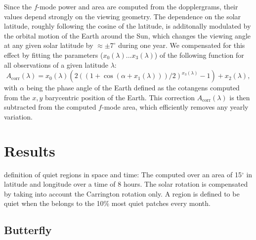 \documentclass{aa}
\begin{document}
Since the $f$-mode power and area are computed from the \los{} dopplergrams, their values depend strongly on the viewing geometry. The dependence on the solar latitude, roughly following the cosine of the latitude, is additonally modulated by the orbital motion of the Earth around the Sun, which changes the viewing angle at any given solar latitude by $\approx \pm7^\circ$ during one year. We compensated for this effect by fitting the parameters ($x_0(\lambda)...x_3(\lambda)$) of the following function for all observations of a given latitude $\lambda$:
\begin{equation}
\label{eq:orbitcorr}
A_{\mbox{corr}}(\lambda) = x_0(\lambda) (  2 ( (1+\cos(\alpha+x_1(\lambda)))/2)^{x_3(\lambda)}-1   )+ x_2(\lambda),
\end{equation}
with $\alpha$ being the phase angle of the Earth defined as the cotangens computed from the $x,y$ barycentric position of the Earth.
This correction $A_{\mbox{corr}}(\lambda)$ is then subtracted from the computed $f$-mode area, which efficiently removes any yearly variation. 

\section{Results}





definition of quiet regions in space and time: 
The \brms{} computed over an area of 15$^\circ$ in latitude and longitude over a time of 8 hours. The solar rotation is compensated by taking into account the Carrington rotation only. A region is defined to be quiet when the \brms{} belongs to the 10\% most quiet patches every month.




\subsection{Butterfly}
\end{document}
